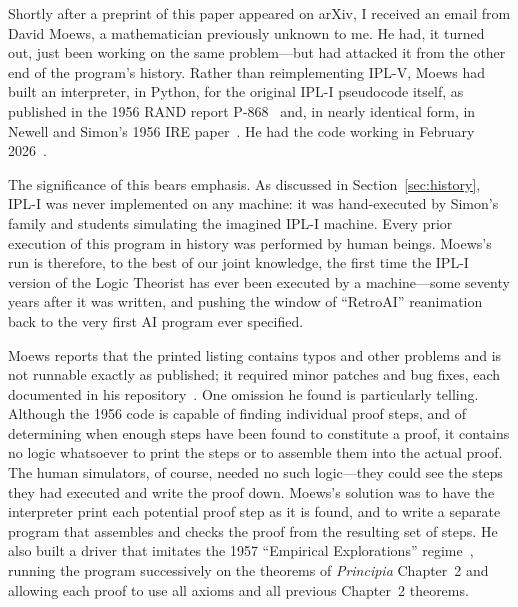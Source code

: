 \documentclass[journal]{IEEEtran}
\begin{document}
Shortly after a preprint of this paper appeared on arXiv, I received
an email from David Moews, a mathematician previously unknown to
me. He had, it turned out, just been working on the same
problem---but had attacked it from the other end of the program's
history. Rather than reimplementing IPL-V, Moews had built an
interpreter, in Python, for the original IPL-I pseudocode itself, as
published in the 1956 RAND report P-868~\cite{LT1956a} and, in nearly
identical form, in Newell and Simon's 1956 IRE
paper~\cite{LT1956b}. He had the code working in February
2026~\cite{moewsrepo}.

The significance of this bears emphasis. As discussed in
Section~\ref{sec:history}, IPL-I was never implemented on any machine:
it was hand-executed by Simon's family and students simulating the
imagined IPL-I machine. Every prior execution of this program in
history was performed by human beings. Moews's run is therefore, to
the best of our joint knowledge, the first time the IPL-I version of
the Logic Theorist has ever been executed by a machine---some seventy
years after it was written, and pushing the window of ``RetroAI''
reanimation back to the very first AI program ever specified.

Moews reports that the printed listing contains typos and other
problems and is not runnable exactly as published; it required minor
patches and bug fixes, each documented in his
repository~\cite{moewsrepo}. One omission he found is particularly
telling. Although the 1956 code is capable of finding individual proof
steps, and of determining when enough steps have been found to
constitute a proof, it contains no logic whatsoever to print the steps
or to assemble them into the actual proof. The human simulators, of
course, needed no such logic---they could see the steps they had
executed and write the proof down. Moews's solution was to have the
interpreter print each potential proof step as it is found, and to
write a separate program that assembles and checks the proof from the
resulting set of steps. He also built a driver that imitates the 1957
``Empirical Explorations'' regime~\cite{LT1957}, running the program
successively on the theorems of \textit{Principia} Chapter~2 and
allowing each proof to use all axioms and all previous Chapter~2
theorems.

\end{document}
